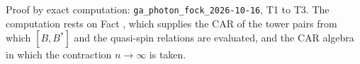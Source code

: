 Proof by exact computation: \texttt{ga\_photon\_fock\_2026-10-16}, T1 to T3. The computation rests on Fact , which supplies the CAR of the tower pairs from which $[B, B^{*}]$ and the quasi-spin relations are evaluated, and the CAR algebra in which the contraction $n \to \infty$ is taken.
